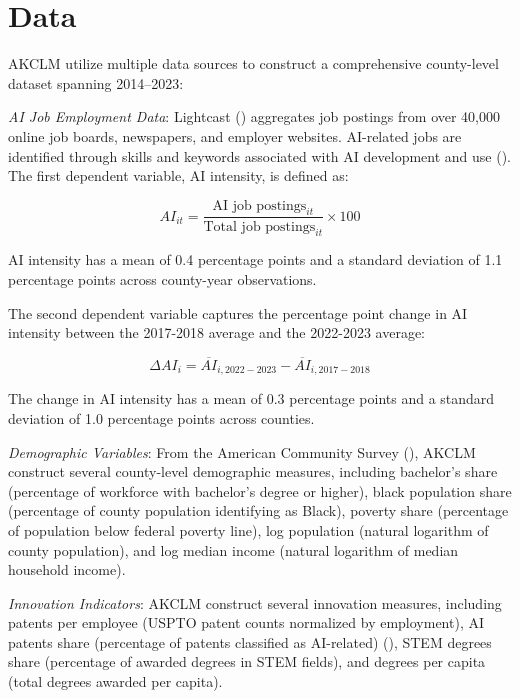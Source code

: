 \documentclass[
]{article}
\begin{document}
\section{Data}\label{data}

AKCLM utilize multiple data sources to construct a comprehensive
county-level dataset spanning 2014--2023:

\emph{AI Job Employment Data}: Lightcast
() aggregates job postings from
over 40,000 online job boards, newspapers, and employer websites.
AI-related jobs are identified through skills and keywords associated
with AI development and use (). The first dependent variable, AI intensity, is defined as:

\[
AI_{it} = \frac{\text{AI job postings}_{it}}{\text{Total job postings}_{it}} \times 100 \tag{1}
\]

AI intensity has a mean of 0.4 percentage points and a standard
deviation of 1.1 percentage points across county-year observations.

The second dependent variable captures the percentage point change in AI
intensity between the 2017-2018 average and the 2022-2023 average:

\[
\Delta AI_{i} = \overline{AI}_{i,2022-2023} - \overline{AI}_{i,2017-2018} \tag{2}
\]

The change in AI intensity has a mean of 0.3 percentage points and a
standard deviation of 1.0 percentage points across counties.

\emph{Demographic Variables}: From the American Community Survey
(), AKCLM construct
several county-level demographic measures, including bachelor's share
(percentage of workforce with bachelor's degree or higher), black
population share (percentage of county population identifying as Black),
poverty share (percentage of population below federal poverty line), log
population (natural logarithm of county population), and log median
income (natural logarithm of median household income).

\emph{Innovation Indicators}: AKCLM construct several innovation
measures, including patents per employee (USPTO patent counts normalized
by employment), AI patents share (percentage of patents classified as
AI-related) (), STEM degrees share (percentage of awarded degrees in STEM
fields), and degrees per capita (total degrees awarded per capita).
\end{document}
